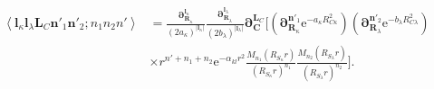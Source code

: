 \documentclass[a4paper,11pt,twoside,openright]{book}
\begin{document}
\begin{align}
  \left\langle\boldsymbol{l}_{\kappa}\boldsymbol{l}_{\lambda}\boldsymbol{L}_{C}%
    \boldsymbol{n}'_{1}\boldsymbol{n}'_{2};n_{1}n_{2}n'\right\rangle
  &=\frac{\boldsymbol{\partial}_{\boldsymbol{R}_{\kappa}}^{\boldsymbol{l}_{\kappa}}}%
      {(2a_{\kappa})^{|\boldsymbol{l}_{\kappa}|}}%
    \frac{\boldsymbol{\partial}_{\boldsymbol{R}_{\lambda}}^{\boldsymbol{l}_{\lambda}}}%
      {(2b_{\lambda})^{|\boldsymbol{l}_{\lambda}|}}%
    \boldsymbol{\partial}_{\boldsymbol{C}}^{\boldsymbol{L}_{C}}\Biggl[%
      \left(\boldsymbol{\partial}_{\boldsymbol{R}_{\kappa}}^{\boldsymbol{n}'_{1}}%
        \mathrm{e}^{-a_{\kappa}R_{C\kappa}^{2}}\right)%
    \left(\boldsymbol{\partial}_{\boldsymbol{R}_{\lambda}}^{\boldsymbol{n}'_{2}}%
      \mathrm{e}^{-b_{\lambda}R_{C\lambda}^{2}}\right)\\
  &\times r^{n'+n_1+n_2}\mathrm{e}^{-\alpha_{kl}r^2}%
    \frac{M_{n_1}(R_{S_{\kappa}}r)}{(R_{S_{\kappa}}r)^{n_1}}%
    \frac{M_{n_2}(R_{S_{\lambda}}r)}{(R_{S_{\lambda}}r)^{n_2}}\Biggr].\nonumber
\end{align}
\end{document}
